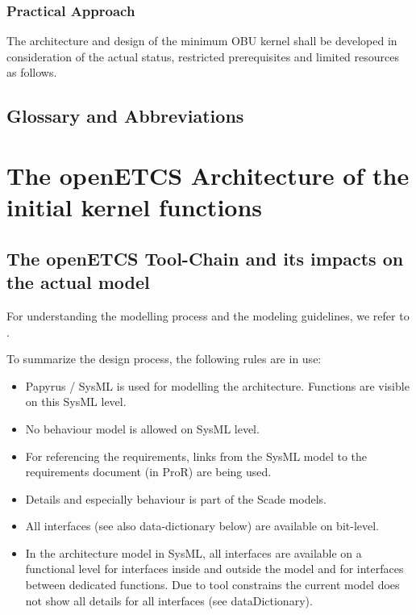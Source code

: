 \documentclass{template/openetcs_article}
\begin{document}
\subsubsection{Practical Approach}
\label{sec:PracticalApproach}

The architecture and design of the minimum OBU kernel shall be developed in consideration of the actual status, restricted prerequisites and limited resources as follows. 

\subsection{Glossary and Abbreviations}


\section{The openETCS Architecture of the initial kernel functions}

\subsection{The openETCS Tool-Chain and its impacts on the actual model}

For understanding the modelling process and the modeling guidelines, we refer to \cite{wp3-dow}. 

To summarize the design process, the following rules are in use:
\begin{itemize}
\item Papyrus / SysML is used for modelling the architecture. Functions are visible on this SysML level.
\item No behaviour model is allowed on SysML level.
\item For referencing the requirements, links from the SysML model to the requirements document (in ProR) are being used.
\item Details and especially behaviour is part of the Scade models.
\item All interfaces (see also data-dictionary below) are available on bit-level.
\item In the architecture model in SysML, all interfaces are available on a functional level for interfaces inside and outside the model and for interfaces between dedicated functions. Due to tool constrains the current model does not show all details for all interfaces (see dataDictionary).
\end{itemize}
\end{document}
